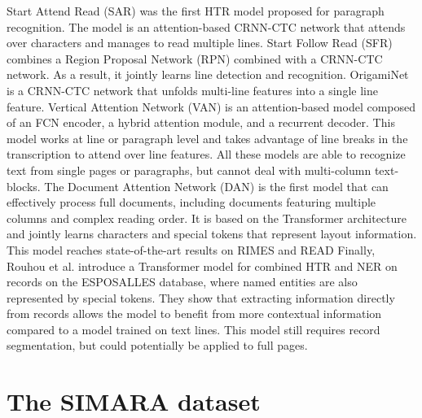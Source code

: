 \documentclass[runningheads]{llncs}
\begin{document}
Start Attend Read (SAR)  was the first HTR model proposed for paragraph recognition. The model is an attention-based CRNN-CTC network that attends over characters and manages to read multiple lines. 
Start Follow Read (SFR) \cite{Wigington2018-start-follow-read} combines a Region Proposal Network (RPN) combined with a CRNN-CTC network. As a result, it jointly learns line detection and recognition.
OrigamiNet \cite{OrigamiNet} is a CRNN-CTC network that unfolds multi-line features into a single line feature. 
Vertical Attention Network (VAN) \cite{VAN} is an attention-based model composed of an FCN encoder, a hybrid attention module, and a recurrent decoder. This model works at line or paragraph level and takes advantage of line breaks in the transcription to attend over line features.
All these models are able to recognize text from single pages or paragraphs, but cannot deal with multi-column text-blocks. 
The Document Attention Network (DAN) \cite{DAN} is the first model that can effectively process full documents, including documents featuring multiple columns and complex reading order. It is based on the Transformer architecture and jointly learns characters and special tokens that represent layout information. This model reaches state-of-the-art results on RIMES \cite{RIMES} and READ \cite{READ2016}
Finally, Rouhou et al. \cite{Rouhou2021-IEHHR-Transformer} introduce a Transformer model for combined HTR and NER on records on the ESPOSALLES database, where named entities are also represented by special tokens. They show that extracting information directly from records allows the model to benefit from more contextual information compared to a model trained on text lines. This model still requires record segmentation, but could potentially be applied to full pages.

\section{The SIMARA dataset} \label{section_simara_dataset}
\end{document}
